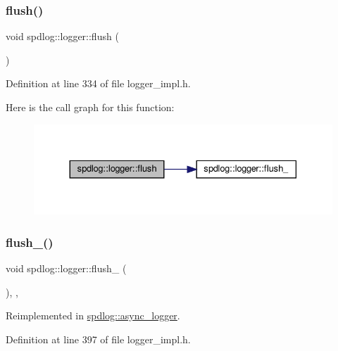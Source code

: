 \subsubsection{\texorpdfstring{flush()}{flush()}}
{\footnotesize\ttfamily void spdlog\+::logger\+::flush (\begin{DoxyParamCaption}{ }\end{DoxyParamCaption})\hspace{0.3cm}{\ttfamily [inline]}}



Definition at line 334 of file logger\+\_\+impl.\+h.

Here is the call graph for this function\+:
\nopagebreak
\begin{figure}[H]
\begin{center}
\leavevmode
\includegraphics[width=330pt]{classspdlog_1_1logger_a861bb4d4e65de07966148822075bee86_cgraph}
\end{center}
\end{figure}
\mbox{\label{classspdlog_1_1logger_a98981b19089a6000fdfa8765af52ef0e}} 
\subsubsection{\texorpdfstring{flush\+\_\+()}{flush\_()}}
{\footnotesize\ttfamily void spdlog\+::logger\+::flush\+\_\+ (\begin{DoxyParamCaption}{ }\end{DoxyParamCaption})\hspace{0.3cm}{\ttfamily [inline]}, {\ttfamily [protected]}, {\ttfamily [virtual]}}



Reimplemented in \hyperlink{classspdlog_1_1async__logger_ae7eeca32af4d650bc1e2dd06122d0224}{spdlog\+::async\+\_\+logger}.



Definition at line 397 of file logger\+\_\+impl.\+h.

